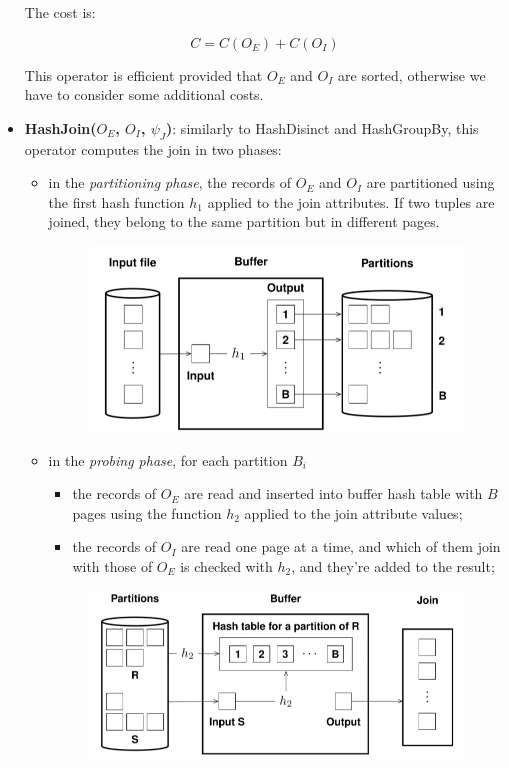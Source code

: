 \begin{itemize}
    The cost is:

    $$
    C = C(O_E) + C(O_I)
    $$

    This operator is efficient provided that $O_E$ and $O_I$ are sorted, otherwise we have to consider some additional costs.

    \item \textbf{HashJoin($O_E$, $O_I$, $\psi_J$)}: similarly to HashDisinct and HashGroupBy, this operator computes the join in two phases:
    \begin{itemize}
        \item in the \textit{partitioning phase}, the records of $O_E$ and $O_I$ are partitioned using the first hash function $h_1$ applied to the join attributes. If two tuples are joined, they belong to the same partition but in different pages.

        \begin{figure}[H]
		\centering
		\includegraphics[scale = 0.8]{img/relop10.jpg}
		\label{relop6}
        \end{figure}

        
        \item in the \textit{probing phase}, for each partition $B_i$ 
        \begin{itemize}
            \item the records of $O_E$ are read and inserted into buffer hash table with $B$ pages using the function $h_2$ applied to the join attribute values;
            \item the records of $O_I$ are read one page at a time, and which of them join with those of $O_E$ is checked with $h_2$, and they're added to the result;
        \end{itemize}

        \begin{figure}[H]
		\centering
		\includegraphics[scale = 0.9]{img/relop11.jpg}
		\label{relop6}
        \end{figure}


\end{itemize}
\end{itemize}
